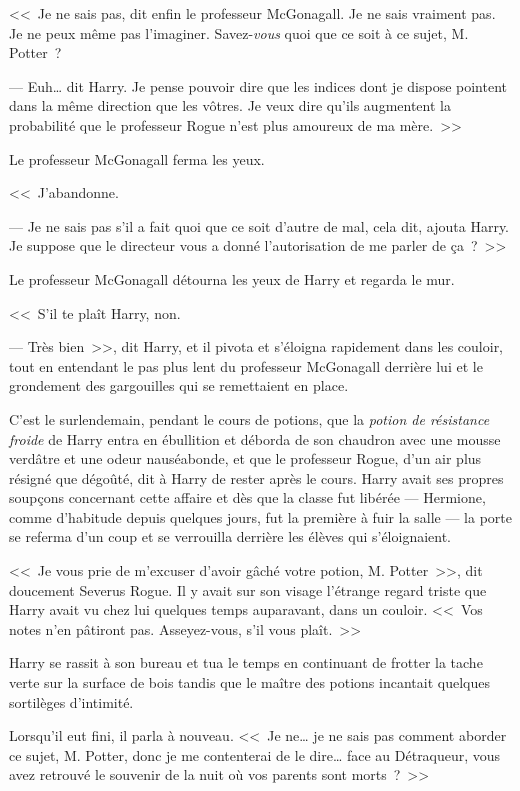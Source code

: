 \later

<<~Je ne sais pas, dit enfin le professeur McGonagall. Je ne sais vraiment pas. Je ne peux même pas l'imaginer. Savez-\emph{vous} quoi que ce soit à ce sujet, M. Potter~?

--- Euh… dit Harry. Je pense pouvoir dire que les indices dont je dispose pointent dans la même direction que les vôtres. Je veux dire qu'ils augmentent la probabilité que le professeur Rogue n'est plus amoureux de ma mère.~>>

Le professeur McGonagall ferma les yeux.

<<~J'abandonne.

--- Je ne sais pas s'il a fait quoi que ce soit d'autre de mal, cela dit, ajouta Harry. Je suppose que le directeur vous a donné l'autorisation de me parler de ça~?~>>

Le professeur McGonagall détourna les yeux de Harry et regarda le mur.

<<~S'il te plaît Harry, non.

--- Très bien~>>, dit Harry, et il pivota et s'éloigna rapidement dans les couloir, tout en entendant le pas plus lent du professeur McGonagall derrière lui et le grondement des gargouilles qui se remettaient en place.

\later

C'est le surlendemain, pendant le cours de potions, que la \emph{potion de résistance froide} de Harry entra en ébullition et déborda de son chaudron avec une mousse verdâtre et une odeur nauséabonde, et que le professeur Rogue, d'un air plus résigné que dégoûté, dit à Harry de rester après le cours. Harry avait ses propres soupçons concernant cette affaire et dès que la classe fut libérée — Hermione, comme d'habitude depuis quelques jours, fut la première à fuir la salle — la porte se referma d'un coup et se verrouilla derrière les élèves qui s'éloignaient.

<<~Je vous prie de m'excuser d'avoir gâché votre potion, M. Potter~>>, dit doucement Severus Rogue. Il y avait sur son visage l'étrange regard triste que Harry avait vu chez lui quelques temps auparavant, dans un couloir. <<~Vos notes n'en pâtiront pas. Asseyez-vous, s'il vous plaît.~>>

Harry se rassit à son bureau et tua le temps en continuant de frotter la tache verte sur la surface de bois tandis que le maître des potions incantait quelques sortilèges d'intimité.

Lorsqu'il eut fini, il parla à nouveau. <<~Je ne… je ne sais pas comment aborder ce sujet, M. Potter, donc je me contenterai de le dire… face au Détraqueur, vous avez retrouvé le souvenir de la nuit où vos parents sont morts~?~>>

